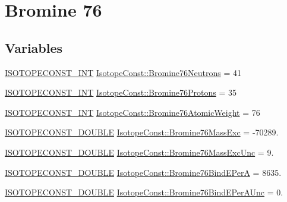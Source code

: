 \hypertarget{group___isotope_const-_bromine-_br76}{}\section{Bromine 76}
\label{group___isotope_const-_bromine-_br76}
\subsection*{Variables}
\begin{DoxyCompactItemize}
\item 
\mbox{\hyperlink{group___isotope_const-_macros_ga5f18360b3e99483a35c32d789e62621c}{I\+S\+O\+T\+O\+P\+E\+C\+O\+N\+S\+T\+\_\+\+I\+NT}} \mbox{\hyperlink{group___isotope_const-_bromine-_br76_ga3abd2a806aa35d62983c6592e49e954d}{Isotope\+Const\+::\+Bromine76\+Neutrons}} = 41
\item 
\mbox{\hyperlink{group___isotope_const-_macros_ga5f18360b3e99483a35c32d789e62621c}{I\+S\+O\+T\+O\+P\+E\+C\+O\+N\+S\+T\+\_\+\+I\+NT}} \mbox{\hyperlink{group___isotope_const-_bromine-_br76_ga814ad76350f742acc9fb8432147bb76c}{Isotope\+Const\+::\+Bromine76\+Protons}} = 35
\item 
\mbox{\hyperlink{group___isotope_const-_macros_ga5f18360b3e99483a35c32d789e62621c}{I\+S\+O\+T\+O\+P\+E\+C\+O\+N\+S\+T\+\_\+\+I\+NT}} \mbox{\hyperlink{group___isotope_const-_bromine-_br76_ga01e8d83dfddeec465311319ca81c91f7}{Isotope\+Const\+::\+Bromine76\+Atomic\+Weight}} = 76
\item 
\mbox{\hyperlink{group___isotope_const-_macros_ga8f45a7272ce02c0b4c65c44636ed719a}{I\+S\+O\+T\+O\+P\+E\+C\+O\+N\+S\+T\+\_\+\+D\+O\+U\+B\+LE}} \mbox{\hyperlink{group___isotope_const-_bromine-_br76_ga374b52c3b2937c98a0deb590ee7a61b9}{Isotope\+Const\+::\+Bromine76\+Mass\+Exc}} = -\/70289.
\item 
\mbox{\hyperlink{group___isotope_const-_macros_ga8f45a7272ce02c0b4c65c44636ed719a}{I\+S\+O\+T\+O\+P\+E\+C\+O\+N\+S\+T\+\_\+\+D\+O\+U\+B\+LE}} \mbox{\hyperlink{group___isotope_const-_bromine-_br76_gad9fd6139a23cf54d541e1ec05097b160}{Isotope\+Const\+::\+Bromine76\+Mass\+Exc\+Unc}} = 9.
\item 
\mbox{\hyperlink{group___isotope_const-_macros_ga8f45a7272ce02c0b4c65c44636ed719a}{I\+S\+O\+T\+O\+P\+E\+C\+O\+N\+S\+T\+\_\+\+D\+O\+U\+B\+LE}} \mbox{\hyperlink{group___isotope_const-_bromine-_br76_ga3c004bd589aaca0f1499a01db9ce72da}{Isotope\+Const\+::\+Bromine76\+Bind\+E\+PerA}} = 8635.
\item 
\mbox{\hyperlink{group___isotope_const-_macros_ga8f45a7272ce02c0b4c65c44636ed719a}{I\+S\+O\+T\+O\+P\+E\+C\+O\+N\+S\+T\+\_\+\+D\+O\+U\+B\+LE}} \mbox{\hyperlink{group___isotope_const-_bromine-_br76_ga3f2897c017bb5dcca80de27694320bed}{Isotope\+Const\+::\+Bromine76\+Bind\+E\+Per\+A\+Unc}} = 0.

\end{DoxyCompactItemize}
